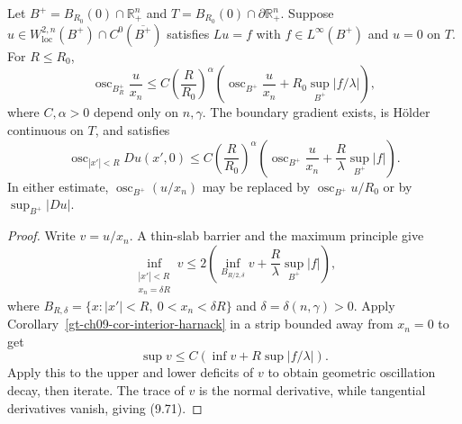 \begin{theorem}
\label{gt-ch09-thm-boundary-holder-normal-quotient}
Let $B^+=B_{R_0}(0)\cap\mathbb R^n_+$ and
$T=B_{R_0}(0)\cap\partial\mathbb R^n_+$.  Suppose
$u\in W^{2,n}_{\mathrm{loc}}(B^+)\cap C^0(\overline{B^+})$ satisfies
$Lu=f$ with $f\in L^\infty(B^+)$ and $u=0$ on $T$.  For $R\le R_0$,
\begin{equation}\tag{9.68}
\operatorname{osc}_{B_R^+}\frac u{x_n}\le
C\left(\frac R{R_0}\right)^\alpha
\left(\operatorname{osc}_{B^+}\frac u{x_n}
+R_0\sup_{B^+}|f/\lambda|\right),
\end{equation}
where $C,\alpha>0$ depend only on $n,\gamma$.  The boundary gradient exists,
is H\"older continuous on $T$, and satisfies
\begin{equation}\tag{9.71}
\operatorname{osc}_{|x'|<R}Du(x',0)\le
C\left(\frac R{R_0}\right)^\alpha
\left(\operatorname{osc}_{B^+}\frac u{x_n}
+\frac R\lambda\sup_{B^+}|f|\right).
\end{equation}
In either estimate, $\operatorname{osc}_{B^+}(u/x_n)$ may be replaced by
$\operatorname{osc}_{B^+}u/R_0$ or by $\sup_{B^+}|Du|$.
\end{theorem}
\begin{proof}
\sketch Write $v=u/x_n$.  A thin-slab barrier and the maximum principle give
\begin{equation}
\tag{9.69}
\inf_{\substack{|x'|<R\\x_n=\delta R}}v
\leq2\left(\inf_{B_{R/2,\delta}}v
+\frac R\lambda\sup_{B^+}|f|\right),
\end{equation}
where $B_{R,\delta}=\{x:|x'|<R,\ 0<x_n<\delta R\}$ and
$\delta=\delta(n,\gamma)>0$. Apply
Corollary~\ref{gt-ch09-cor-interior-harnack} in a
strip bounded away from $x_n=0$ to get
\[
\sup v\le C\left(\inf v+R\sup|f/\lambda|\right).\tag{9.70}
\]
Apply this to the upper and lower deficits of $v$ to obtain geometric
oscillation decay, then iterate.  The trace of $v$ is the normal derivative,
while tangential derivatives vanish, giving (9.71).
\end{proof}

